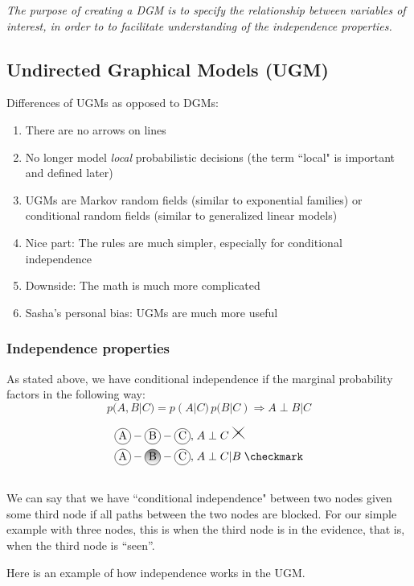 \documentclass{article}
\begin{document}
\emph{The purpose of creating a DGM is to specify the relationship between variables of interest, in order to to facilitate understanding of the independence properties.}

\subsection{Undirected Graphical Models (UGM)}

Differences of UGMs as opposed to DGMs:
\begin{enumerate}
	\item There are no arrows on lines
	\item No longer model \emph{local} probabilistic decisions (the term ``local" is important and defined later)
	\item UGMs are Markov random fields (similar to exponential families) or conditional random fields (similar to 		generalized linear models)
	\item Nice part: The rules are much simpler, especially for conditional independence
	\item Downside: The math is much more complicated
	\item Sasha's personal bias: UGMs are much more useful
\end{enumerate}


\subsubsection{Independence properties}

As stated above, we have conditional independence if the marginal probability factors in the following way:
\begin{equation}
p(A,B|C) = p(A|C) \, p(B|C) \Rightarrow A \perp B | C
\end{equation}

\begin{align}
\encirc{A} - \encirc{B} - \encirc{C}, \; &A \perp C \; \crossmark \\
\encirc{A} - \encircshaded{B} - \encirc{C}, \; &A \perp C|B \; \checkmark \\
\smallskip
\end{align}
We can say that we have ``conditional independence" between two nodes given some third node if all paths between the two nodes are blocked. For our simple example with three nodes, this is when the third node is in the evidence, that is, when the third node is ``seen''.
\smallskip

Here is an example of how independence works in the UGM.
\begin{center}
\end{center}
\end{document}
